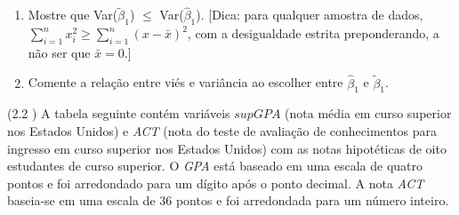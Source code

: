 \documentclass[12pt,letterpaper, onecolumn]{exam}
\begin{document}
\begin{questions}
\begin{enumerate}[label=(\alph*)]
    \item Mostre que Var($\tilde \beta_1$) $\leq$ Var($\hat \beta_1$). [Dica: para qualquer amostra de dados, $\sum^n_{i = 1}x^2_i \geq \sum^n_{i=1}(x - \bar{x})^2$, com a desigualdade estrita preponderando, a não ser que $\bar{x} = 0$.]

    \item Comente a relação entre viés e variância ao escolher entre $\hat \beta_1$ e $\tilde \beta_1$.
    \end{enumerate}




    \question (2.2 \citep{wooldridge2010}) A tabela seguinte contém variáveis $supGPA$ (nota média em curso superior nos Estados Unidos) e \textit{ACT} (nota do teste de avaliação de conhecimentos para ingresso em curso superior nos Estados Unidos) com as notas hipotéticas de oito estudantes de curso superior. O \textit{GPA} está baseado em uma escala de quatro pontos e foi arredondado para um dígito após o ponto decimal. A nota \textit{ACT} baseia-se em uma escala de 36 pontos e foi arredondada para um número inteiro.


\end{questions}
\end{document}
